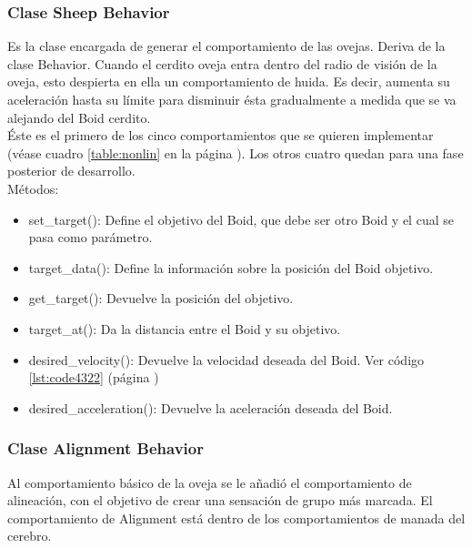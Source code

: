 \subsubsection{Clase Sheep Behavior}
\label{subsubsection:sheep_behavior}

Es la clase encargada de generar el comportamiento de las ovejas. Deriva de la clase Behavior. Cuando el cerdito oveja entra dentro del 
radio de visión de la oveja, esto despierta en ella un comportamiento de huida. Es decir, aumenta su aceleración hasta su límite para 
disminuir ésta gradualmente a medida que se va alejando del Boid cerdito.\\

Éste es el primero de los cinco comportamientos que se quieren implementar (véase cuadro \ref{table:nonlin} en la página \pageref{table:nonlin}). Los otros cuatro quedan para una 
fase posterior de desarrollo.\\

Métodos:
\begin{itemize}
\item set\_target():
Define el objetivo del Boid, que debe ser otro Boid y el cual se pasa como parámetro.

\item target\_data():
Define la información sobre la posición del Boid objetivo.

\item get\_target():
Devuelve la posición del objetivo.

\item target\_at():
Da la distancia entre el Boid y su objetivo.

\item desired\_velocity():
Devuelve la velocidad deseada del Boid. Ver código \ref{lst:code4322} (página \pageref{lst:code4322})

\item desired\_acceleration():
Devuelve la aceleración deseada del Boid.
\end{itemize}


\subsubsection{Clase Alignment Behavior}
\label{subsubsection:alignment_behavior}

Al comportamiento básico de la oveja se le añadió el comportamiento de alineación, con el objetivo de crear una sensación de grupo más 
marcada. El comportamiento de Alignment está dentro de los comportamientos de manada del cerebro.\\


